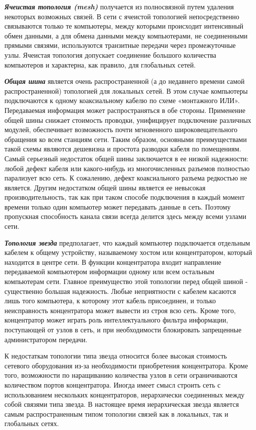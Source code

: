 \textbf{\textit{Ячеистая топология (mesh)}} получается из полносвязной путем удаления некоторых возможных связей.
В сети с ячеистой топологией непосредственно связываются только те компьютеры, между которыми происходит интенсивный обмен данными, а для обмена данными между компьютерами, не соединенными прямыми связями, используются транзитные передачи через промежуточные узлы.
Ячеистая топология допускает соединение большого количества компьютеров и характерна, как правило, для глобальных сетей.

\textbf{\textit{Общая шина}} является очень распространенной (а до недавнего времени самой распространенной) топологией для локальных сетей.
В этом случае компьютеры подключаются к одному коаксиальному кабелю по схеме «монтажного ИЛИ».
Передаваемая информация может распространяться в обе стороны.
Применение общей шины снижает стоимость проводки, унифицирует подключение различных модулей, обеспечивает возможность почти мгновенного широковещательного обращения ко всем станциям сети.
Таким образом, основными преимуществами такой схемы являются дешевизна и простота разводки кабеля по помещениям.
Самый серьезный недостаток общей шины заключается в ее низкой надежности: любой дефект кабеля или какого-нибудь из многочисленных разъемов полностью парализует всю сеть.
К сожалению, дефект коаксиального разъема редкостью не является.
Другим недостатком общей шины является ее невысокая производительность, так как при таком способе подключения в каждый момент времени только один компьютер может передавать данные в сеть.
Поэтому пропускная способность канала связи всегда делится здесь между всеми узлами сети.

\textbf{\textit{Топология звезда}} предполагает, что каждый компьютер подключается отдельным кабелем к общему устройству, называемому хостом или концентратором, который находится в центре сети.
В функции концентратора входит направление передаваемой компьютером информации одному или всем остальным компьютерам сети.
Главное преимущество этой топологии перед общей шиной - существенно большая надежность.
Любые неприятности с кабелем касаются лишь того компьютера, к которому этот кабель присоединен, и только неисправность концентратора может вывести из строя всю сеть.
Кроме того, концентратор может играть роль интеллектуального фильтра информации, поступающей от узлов в сеть, и при необходимости блокировать запрещенные администратором передачи.

К недостаткам топологии типа звезда относится более высокая стоимость сетевого оборудования из-за необходимости приобретения концентратора.
Кроме того, возможности по наращиванию количества узлов в сети ограничиваются количеством портов концентратора.
Иногда имеет смысл строить сеть с использованием нескольких концентраторов, иерархически соединенных между собой связями типа звезда.
В настоящее время иерархическая звезда является самым распространенным типом топологии связей как в локальных, так и глобальных сетях.

